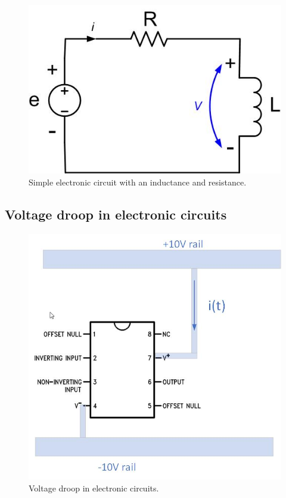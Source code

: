 \documentclass{ximera}
\begin{document}
\begin{figure}[htbp]
\begin{center}
\includegraphics[scale=0.5]{../jpg/CircuitwithInductor.jpg}
\end{center}
\caption{Simple electronic circuit with an inductance and resistance. }
\label{MutualInduc4}
\end{figure}



\begin{example}
\subsection{Voltage droop in electronic circuits}



\begin{figure}[htbp]
\begin{center}
\includegraphics[scale=0.5]{../jpg/ICcircuitWithRailandGround.jpg}
\end{center}
\caption{Voltage droop in electronic circuits. }
\label{MutualInduc5}
\end{figure}

\end{example}
\end{document}
